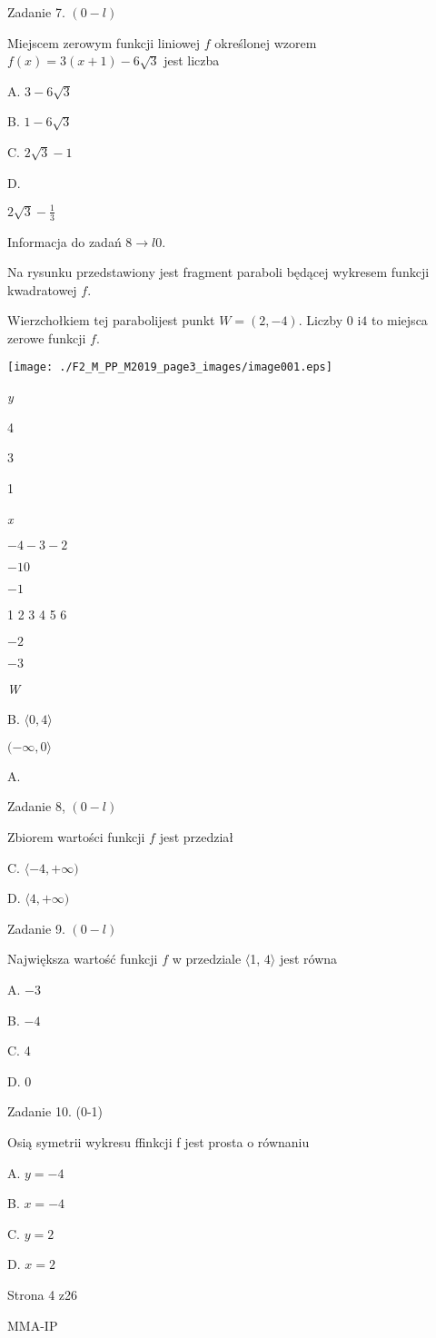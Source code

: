 \documentclass[a4paper,12pt]{article}
\begin{document}
Zadanie 7. $(0-l)$

Miejscem zerowym funkcji liniowej $f$ określonej wzorem $f(x)=3(x+1)-6\sqrt{3}$ jest liczba

A. $3-6\sqrt{3}$

B. $1-6\sqrt{3}$

C. $2\sqrt{3}-1$

D.

$2\displaystyle \sqrt{3}-\frac{1}{3}$

Informacja do zadań $8\rightarrow l0.$

Na rysunku przedstawiony jest fragment paraboli będącej wykresem funkcji kwadratowej $f.$

Wierzchołkiem tej parabolijest punkt $W=(2,-4)$. Liczby 0 $\mathrm{i}4$ to miejsca zerowe funkcji $f.$
\begin{center}
\texttt{[image: ./F2\_M\_PP\_M2019\_page3\_images/image001.eps]}
\end{center}
{\it y}

4

3

1

{\it x}

$-4 -3  -2$

$-1 0$

$-1$

1 2 3 4  5 6

$-2$

$-3$

{\it W}

B. $\langle 0,  4\rangle$

$(-\infty,  0\rangle$

A.

Zadanie 8, $(0-l)$

Zbiorem wartości funkcji $f$ jest przedział

C. $\langle-4, +\infty)$

D. $\langle 4, +\infty)$

Zadanie 9. $(0-l)$

Największa wartość funkcji $f$ w przedziale $\langle$1, $ 4\rangle$ jest równa

A. $-3$

B. $-4$

C. 4

D. 0

Zadanie 10. (0-1)

Osią symetrii wykresu ffinkcji f jest prosta o równaniu

A. $y=-4$

B. $x=-4$

C. $y=2$

D. $x=2$

Strona 4 z26

MMA-IP
\end{document}

